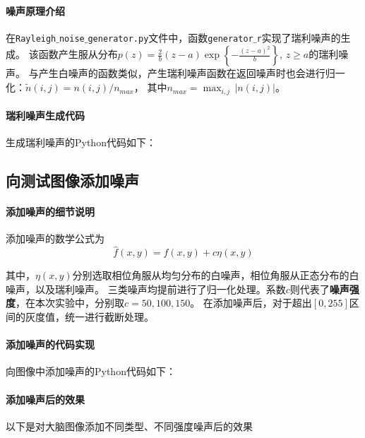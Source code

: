 \documentclass{article}
\begin{document}
\paragraph{噪声原理介绍}
在\texttt{Rayleigh$\_$noise$\_$generator.py}文件中，函数\texttt{generator$\_$r}实现了瑞利噪声的生成。
该函数产生服从分布$p(z)=\frac{2}{b}(z-a)\exp\left\{-\frac{(z-a)^2}{b}\right\},\,z\ge a$的瑞利噪声。
与产生白噪声的函数类似，产生瑞利噪声函数在返回噪声时也会进行归一化：$\tilde{n}(i,j) = n(i,j)/n_{max}$，
其中$n_{max} = \mathop{max}_{i,j}\,|n(i,j)|$。

\paragraph{瑞利噪声生成代码}
生成瑞利噪声的Python代码如下：
 

\subsection{向测试图像添加噪声}
\paragraph{添加噪声的细节说明}
添加噪声的数学公式为
\[
\hat{f}(x,y) = f(x,y) + c\eta(x,y)    
\]

其中，$\eta(x,y)$分别选取相位角服从均匀分布的白噪声，相位角服从正态分布的白噪声，以及瑞利噪声。
三类噪声均提前进行了归一化处理。系数$c$则代表了\textbf{噪声强度}，在本次实验中，分别取$c=50,100,150$。
在添加噪声后，对于超出$[0,255]$区间的灰度值，统一进行截断处理。

\paragraph{添加噪声的代码实现}
向图像中添加噪声的Python代码如下：
 

\paragraph{添加噪声后的效果}
以下是对大脑图像添加不同类型、不同强度噪声后的效果
\end{document}
